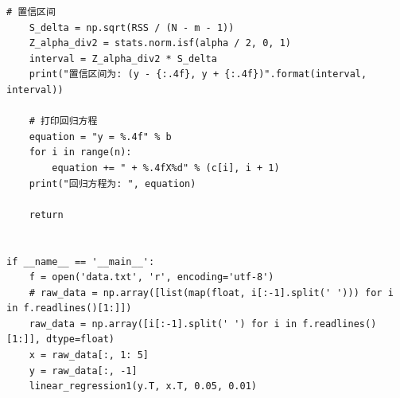 \documentclass[UTF8]{ctexart}
\begin{document}
\begin{lstlisting}[style = python]
    # 置信区间
    S_delta = np.sqrt(RSS / (N - m - 1))
    Z_alpha_div2 = stats.norm.isf(alpha / 2, 0, 1)
    interval = Z_alpha_div2 * S_delta
    print("置信区间为: (y - {:.4f}, y + {:.4f})".format(interval, interval))

    # 打印回归方程
    equation = "y = %.4f" % b
    for i in range(n):
        equation += " + %.4fX%d" % (c[i], i + 1)
    print("回归方程为: ", equation)

    return


if __name__ == '__main__':
    f = open('data.txt', 'r', encoding='utf-8')
    # raw_data = np.array([list(map(float, i[:-1].split(' '))) for i in f.readlines()[1:]])
    raw_data = np.array([i[:-1].split(' ') for i in f.readlines()[1:]], dtype=float)
    x = raw_data[:, 1: 5]
    y = raw_data[:, -1]
    linear_regression1(y.T, x.T, 0.05, 0.01)

\end{lstlisting}      
\end{document}
